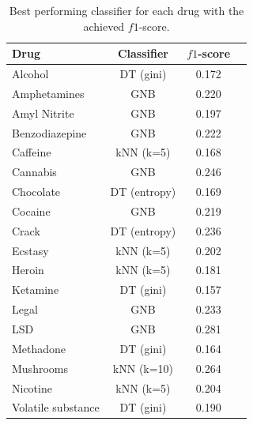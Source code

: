 \documentclass{article}
\begin{document}
\begin{table}[H]
		\centering
    \begin{tabular}{ l c c c }
        \toprule
        \textbf{Drug} & \textbf{Classifier} & \textbf{$f1$-score} \\
        \toprule
        Alcohol & DT (gini) & 0.172 \\
				Amphetamines & GNB & 0.220 \\
        Amyl Nitrite & GNB & 0.197 \\
				Benzodiazepine & GNB & 0.222 \\
				Caffeine & kNN (k=5) & 0.168 \\
				Cannabis & GNB & 0.246 \\
				Chocolate & DT (entropy) & 0.169 \\
        Cocaine & GNB & 0.219 \\
				Crack & DT (entropy) & 0.236 \\
				Ecstasy & kNN (k=5) & 0.202 \\
				Heroin & kNN (k=5) & 0.181 \\
				Ketamine & DT (gini) & 0.157 \\
				Legal & GNB & 0.233 \\
				LSD & GNB & 0.281 \\
        Methadone & DT (gini) & 0.164 \\
				Mushrooms & kNN (k=10) & 0.264 \\
				Nicotine & kNN (k=5) & 0.204 \\
				Volatile substance & DT (gini) & 0.190 \\
        \bottomrule
    \end{tabular}
		\caption{Best performing classifier for each drug with the achieved $f1$-score.}
		\label{tab:drugs_performance_overview}
\end{table}
\end{document}
